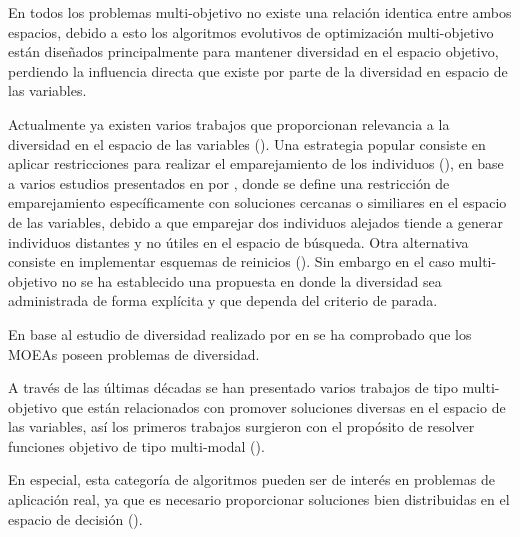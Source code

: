 % 
En todos los problemas multi-objetivo no existe una relación identica entre ambos espacios, debido a esto los algoritmos evolutivos de optimización multi-objetivo están diseñados principalmente para mantener diversidad en el espacio objetivo, perdiendo la influencia directa que existe por parte de la diversidad en espacio de las variables.

%
Actualmente ya existen varios trabajos que proporcionan relevancia a la diversidad en el espacio de las variables (\cite{Joel:GECCO17}).
%
Una estrategia popular consiste en aplicar restricciones para realizar el emparejamiento de los individuos (\cite{Joel:MOEAD_AMS}), en base a varios estudios presentados en  por \citeauthor{Joel:STUDY_MATTING_RESTRICTION}, donde se define una restricción de emparejamiento específicamente con soluciones cercanas o similiares en el espacio de las variables, debido a que emparejar dos individuos alejados tiende a generar individuos distantes y no útiles en el espacio de búsqueda.
%
Otra alternativa consiste en implementar esquemas de reinicios (\cite{ joel:jaeggi2008development, Joel:Improved_Multiobjective_Diversity_Control_Oriented_Genetic_Algorithm}).
%
Sin embargo en el caso multi-objetivo no se ha establecido una propuesta en donde la diversidad sea administrada de forma explícita y que dependa del criterio de parada.
%


En base al estudio de diversidad realizado por \citeauthor{Joel:GECCO17} en  se ha comprobado que los MOEAs poseen problemas de diversidad.
%


A través de las últimas décadas se han presentado varios trabajos de tipo multi-objetivo que están relacionados con promover soluciones diversas en el espacio de las variables, así los primeros trabajos surgieron con el propósito de resolver funciones objetivo de tipo multi-modal (\cite{preuss2006pareto}).

%
En especial, esta categoría de algoritmos pueden ser de interés en problemas de aplicación real, ya que es necesario proporcionar soluciones bien distribuidas en el espacio de decisión (\cite{deb2005omni, rudolph2007capabilities}).

